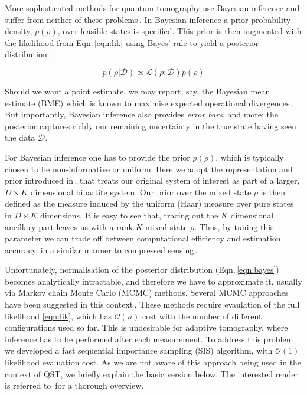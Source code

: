 \documentclass[aps,twocolumn,prl]{revtex4-1}
\newcommand{\param}{{\rho}} \newcommand{\data}{\mathcal{D}}
\begin{document}
More sophisticated methods for quantum tomography use Bayesian inference and suffer from neither of these problems\,\cite[][and refs.]{BayesianTomography}. In Bayesian inference a prior probability density, $p(\param)$, over feasible states is specified. This prior is then augmented with the likelihood from Eqn.\,\eqref{eqn:lik} using Bayes' rule to yield a posterior distribution:

\begin{equation}
\label{eqn:bayes}
p(\param\vert\data)\propto \mathcal{L}(\param;\data)p(\param)
\end{equation}

Should we want a point estimate, we may report, say, the Bayesian mean estimate (BME) which is known to maximise expected operational divergences\,\cite{BayesianTomography,BayesianOptimality}. But importantly, Bayesian inference also provides \emph{error bars}, and more: the posterior captures richly our remaining uncertainty in the true state having seen the data $\data$. 

For Bayesian inference one has to provide the prior $p(\param)$, which is typically chosen to be non-informative or uniform. Here we adopt the representation and prior introduced in\,\cite{BayesianTomography}, that treats our original system of interest as part of a larger, $D\times K$ dimensional bipartite system. Our prior over the mixed state $\param$ is then defined as the measure induced by the uniform (Haar) measure over pure states in $D\times K$ dimensions. It is easy to see that, tracing out the $K$ dimensional ancillary part leaves us with a rank-$K$ mixed state $\rho$. Thus, by tuning this parameter we can trade off between computational efficiency and estimation accuracy, in a similar manner to compressed sensing\,\cite{CompressedSensing}.

Unfortunately, normalisation of the posterior distribution (Eqn.\,\eqref{eqn:bayes}) becomes analytically intractable, and therefore we have to approximate it, usually via Markov chain Monte Carlo (MCMC) methods. Several MCMC approaches have been suggested in this context\,\cite[][and refs.\ therein]{BayesianTomography}. These methods require evaulation of the full likelihood \eqref{eqn:lik}, which has $\mathcal{O}(n)$ cost with the number of different configurations used so far. This is undesirable for adaptive tomography, where inference has to be performed after each measurement. To address this problem we developed a fast sequential importance sampling (SIS) algorithm, with $\mathcal{O}(1)$ likelihood evaluation cost. As we are not aware of this approach being used in the context of QST, we briefly explain the basic version below. The interested reader is referred to\,\cite{SMCBook} for a thorough overview.
\end{document}
